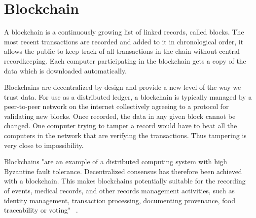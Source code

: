 \section{Blockchain}

A blockchain is a continuously growing list of linked records, called blocks. The most recent transactions are recorded and added to it in chronological order, it allows the public to keep track of all transactions in the chain without central recordkeeping.  Each computer participating in the blockchain gets a copy of the data which is downloaded automatically. 

Blockchains are decentralized by design and provide a new level of the way we trust data. For use as a distributed ledger, a blockchain is typically managed by a peer-to-peer network on the internet collectively agreeing to a protocol for validating new blocks. Once recorded, the data in any given block cannot be changed. One computer trying to tamper a record would have to beat all the computers in the network that are verifying the transactions. Thus tampering is very close to impossibility.

Blockchains "are an example of a distributed computing system with high Byzantine fault tolerance. Decentralized consensus has therefore been achieved with a blockchain. This makes blockchains potentially suitable for the recording of events, medical records, and other records management activities, such as identity management, transaction processing, documenting provenance, food traceability or voting"  ~\cite{hid-sp18-506-Blockchain}.
